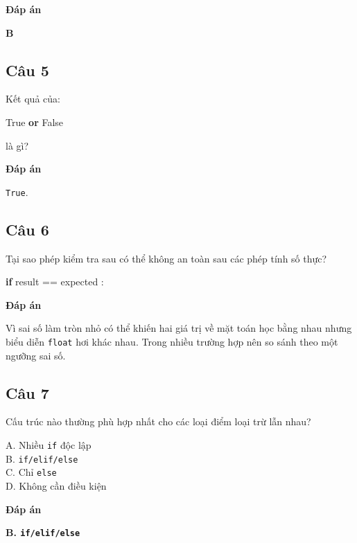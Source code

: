 \documentclass[
  11pt,
  a4paper,
]{article}
\newenvironment{Shaded}{}{}
\newcommand{\ControlFlowTok}[1]{\textcolor[rgb]{0.00,0.44,0.13}{\textbf{#1}}}
\newcommand{\KeywordTok}[1]{\textcolor[rgb]{0.00,0.44,0.13}{\textbf{#1}}}
\newcommand{\NormalTok}[1]{#1}
\newcommand{\OperatorTok}[1]{\textcolor[rgb]{0.40,0.40,0.40}{#1}}
\newcommand{\VariableTok}[1]{\textcolor[rgb]{0.10,0.09,0.49}{#1}}
\begin{document}
\textbf{Đáp án}

\textbf{B}

\subsection{Câu 5}\label{cuxe2u-5}

Kết quả của:

\begin{Shaded}
\begin{Highlighting}[]
\VariableTok{True} \KeywordTok{or} \VariableTok{False}
\end{Highlighting}
\end{Shaded}

là gì?

\textbf{Đáp án}

\texttt{True}.

\subsection{Câu 6}\label{cuxe2u-6}

Tại sao phép kiểm tra sau có thể không an toàn sau các phép tính số
thực?

\begin{Shaded}
\begin{Highlighting}[]
\ControlFlowTok{if}\NormalTok{ result }\OperatorTok{==}\NormalTok{ expected :}
\end{Highlighting}
\end{Shaded}

\textbf{Đáp án}

Vì sai số làm tròn nhỏ có thể khiến hai giá trị về mặt toán học bằng
nhau nhưng biểu diễn \texttt{float} hơi khác nhau. Trong nhiều trường
hợp nên so sánh theo một ngưỡng sai số.

\subsection{Câu 7}\label{cuxe2u-7}

Cấu trúc nào thường phù hợp nhất cho các loại điểm loại trừ lẫn nhau?

A. Nhiều \texttt{if} độc lập\\
B. \texttt{if/elif/else}\\
C. Chỉ \texttt{else}\\
D. Không cần điều kiện

\textbf{Đáp án}

\textbf{B. \texttt{if/elif/else}}
\end{document}
